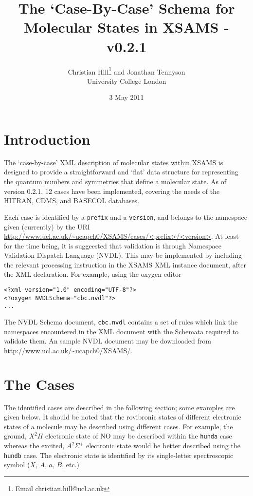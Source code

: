 \documentclass[a4paper]{article} \pagestyle{plain}
\title{The `Case-By-Case' Schema for Molecular States in XSAMS - v0.2.1}
\author{Christian Hill\thanks{Email christian.hill@ucl.ac.uk} and Jonathan Tennyson\\ University College London}
\date{3 May 2011}
\begin{document}
\maketitle
\pagebreak

\section*{Introduction}

The `case-by-case' XML description of molecular states within XSAMS is designed to provide a straightforward and `flat' data structure for representing the quantum numbers and symmetries that define a molecular state. As of version 0.2.1, 12 cases have been implemented, covering the needs of the HITRAN, CDMS, and BASECOL databases.

Each case is identified by a \texttt{prefix} and a \texttt{version}, and belongs to the namespace given (currently) by the URI \url{http://www.ucl.ac.uk/~ucapch0/XSAMS/cases/<prefix>/<version>}. At least for the time being, it is suggeested that validation is through Namespace Validation Dispatch Language (NVDL). This may be implemented by including the relevant processing instruction in the XSAMS XML instance document, after the XML declaration. For example, using the oxygen editor
\begin{verbatim}
<?xml version="1.0" encoding="UTF-8"?>
<?oxygen NVDLSchema="cbc.nvdl"?>
...
\end{verbatim}
The NVDL Schema document, \texttt{cbc.nvdl} contains a set of rules which link the namespaces encountered in the XML document with the Schemata required to validate them. An sample NVDL document may be downloaded from \url{http://www.ucl.ac.uk/~ucapch0/XSAMS/}.

\section*{The Cases}

The identified cases are described in the following section; some examples are given below. It should be noted that the rovibronic states of different electronic states of a molecule may be described using different cases. For example, the ground, $X^2\Pi$ electronic state of $\mathrm{NO}$ may be described within the \texttt{hunda} case whereas the excited, $A^2\Sigma^+$ electronic state would be better described using the \texttt{hundb} case. The electronic state is identified by its single-letter spectroscopic symbol ($X$, $A$, $a$, $B$, etc.)
\end{document}
